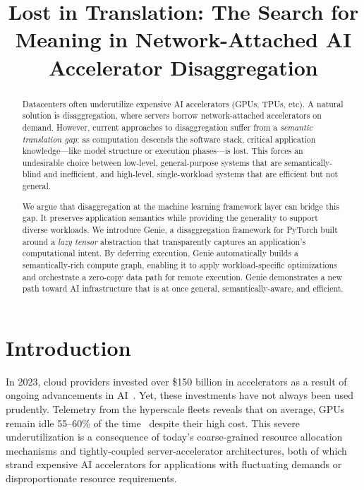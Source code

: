 \newcommand{\sys}{Genie\xspace}
\newcommand{\SemanticFlow}{\textsc{SemanticFlow}}
\newcommand{\lazytensor}{Lazy Tensor\xspace}

\title{Lost in Translation: The Search for Meaning in Network-Attached AI Accelerator Disaggregation}

\begin{abstract}
Datacenters often underutilize expensive AI accelerators (GPUs, TPUs, etc).
A natural solution is disaggregation, where servers borrow network-attached accelerators on demand.
However, current approaches to disaggregation
suffer from a \emph{semantic translation gap}: as computation descends the software stack, critical application knowledge---like model structure or execution phases---is lost.
This forces an undesirable choice between low-level, general-purpose systems that are semantically-blind and inefficient, and high-level, single-workload systems that are efficient but not general.

We argue that disaggregation at the machine learning framework layer 
can bridge this gap.
It preserves application semantics while providing the generality to support diverse workloads.
We introduce \sys, a disaggregation framework for PyTorch built around a \textit{lazy tensor} abstraction that transparently captures an application’s computational intent.
By deferring execution, \sys automatically builds a semantically-rich compute graph, enabling it to apply workload-specific optimizations and orchestrate a zero-copy data path for remote execution.
\sys demonstrates a new path toward AI infrastructure that is at once general, semantically-aware, and efficient.
\end{abstract}

\section{Introduction}
\label{sec:introduction}
In 2023, cloud providers invested over \$150 billion in accelerators as a result of ongoing advancements in AI~\cite{datacenter-accelerators-2024}. 
Yet, 
these investments have not always been used prudently.
Telemetry from the hyperscale fleets reveals that on average, GPUs remain idle 55--60\% of the time~\cite{register-gpu-utilization-2024} despite their high cost.
This severe underutilization is a consequence of today's coarse-grained resource allocation mechanisms and tightly-coupled server-accelerator architectures, both of which strand expensive AI accelerators for applications with fluctuating demands or disproportionate resource requirements.


